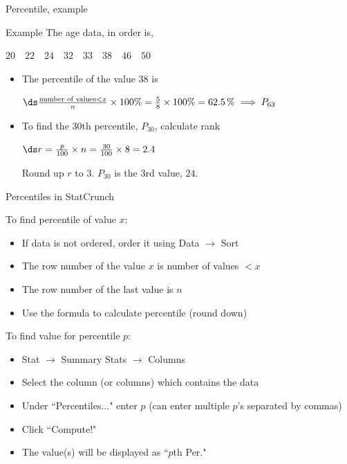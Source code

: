 \documentclass[xcolor=table, handout]{beamer}
\begin{document}
\begin{frame}{Percentile, example}
\begin{exampleblock}{Example}
The age data, in order is, \\
\smallskip
{\centering
$20 \quad 22 \quad 24 \quad 32 \quad 33 \quad 38 \quad 46 \quad 50$
\par}

\begin{itemize}
\pause
\item The percentile of the value 38 is\\
\medskip
{\centering
$\ds \frac{\text{number of values} < x}{n} \times 100\% = \frac{5}{8} \times 100\% = 62.5 \,\% \implies P_{63}$
\par} 
\medskip
\pause\item To find the 30th percentile, $P_{30}$, calculate rank\\
\medskip
{\centering
$\ds r= \frac {p}{100} \times n = \frac {30}{100} \times 8 = 2.4 $
\par}
\medskip
Round up $r$ to $3$. $P_{30}$ is the 3rd value, $24$.
\end{itemize}
\end{exampleblock}
\end{frame}

\begin{frame}{Percentiles in StatCrunch}
\begin{block}{}
To find percentile of value $x$:
\begin{itemize}
\item If data is not ordered, order it using Data $\to$ Sort
\item The row number of the value  $x$ is number of values $< x$
\item The row number of the last value is $n$
\item Use the formula to calculate percentile (round down)
\end{itemize}
To find value for percentile $p$:
\begin{itemize}
\item Stat $\to$ Summary Stats $\to$ Columns
\item Select the column (or columns) which contains the data
\item Under ``Percentiles..." enter $p$ (can enter multiple $p$'s separated by commas)
\item Click ``Compute!"
\item The value(s) will be displayed as ``$p$th Per."
\end{itemize}
\end{block}
\end{frame}
\end{document}
